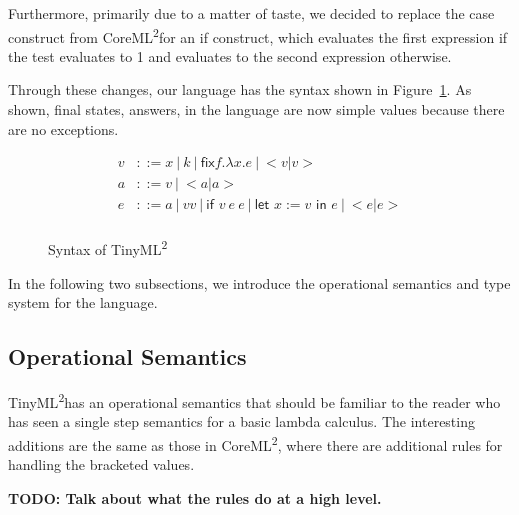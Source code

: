 \documentclass[a4paper]{article}
\newcommand{\langName}[0]{TinyML\textsuperscript{2}}
\newcommand{\origLang}[0]{CoreML\textsuperscript{2}}
\theoremstyle{plain}
\theoremstyle{definition}
\begin{document}
Furthermore, primarily due to a matter of taste, we decided to replace the
\textsf{case} construct from \origLang for an \textsf{if} construct, which
evaluates the first expression if the test evaluates to 1 and evaluates to the
second expression otherwise.

Through these changes, our language has the syntax shown in
Figure~\ref{fig:syntax}.  As shown, final states, answers, in the language are
now simple values because there are no exceptions.

\begin{figure}[h!]
  \begin{align}
    v & ::= x \: | \: k \: | \: \textsf{fix} f . \lambda x . e \tag{values} \: |
    \: <v | v> \\
    a & ::= v \tag{answers} \: | \: <a | a> \\
    e & ::= a \: | \: v v \: | \: \textsf{if } v \: e \: e \: | \: \textsf{let
    } x := v \textsf{ in } e \tag{expressions} \: | \: <e | e> \\
  \end{align}
  \caption{Syntax of \langName}
  \label{fig:syntax}
\end{figure}

In the following two subsections, we introduce the operational semantics and
type system for the language.

\subsection{Operational Semantics}

\langName has an operational semantics that should be familiar to the reader who
has seen a single step semantics for a basic lambda calculus.  The interesting
additions are the same as those in \origLang, where there are additional rules
for handling the bracketed values.

\textbf{TODO: Talk about what the rules do at a high level.}
\end{document}

